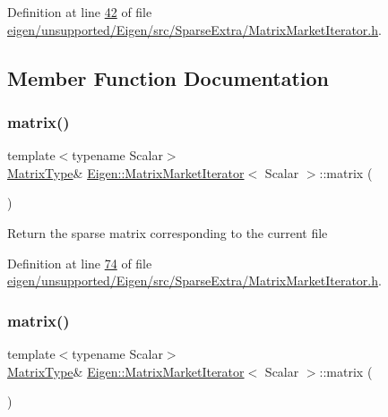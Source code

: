Definition at line \hyperlink{eigen_2unsupported_2_eigen_2src_2_sparse_extra_2_matrix_market_iterator_8h_source_l00042}{42} of file \hyperlink{eigen_2unsupported_2_eigen_2src_2_sparse_extra_2_matrix_market_iterator_8h_source}{eigen/unsupported/\+Eigen/src/\+Sparse\+Extra/\+Matrix\+Market\+Iterator.\+h}.



\subsection{Member Function Documentation}
\mbox{\label{class_eigen_1_1_matrix_market_iterator_ac938961d685306ef5b48d9943f7dcabd}} 
\subsubsection{\texorpdfstring{matrix()}{matrix()}\hspace{0.1cm}{\footnotesize\ttfamily [1/2]}}
{\footnotesize\ttfamily template$<$typename Scalar$>$ \\
\hyperlink{group___sparse_core___module}{Matrix\+Type}\& \hyperlink{class_eigen_1_1_matrix_market_iterator}{Eigen\+::\+Matrix\+Market\+Iterator}$<$ Scalar $>$\+::matrix (\begin{DoxyParamCaption}{ }\end{DoxyParamCaption})\hspace{0.3cm}{\ttfamily [inline]}}

Return the sparse matrix corresponding to the current file 

Definition at line \hyperlink{eigen_2unsupported_2_eigen_2src_2_sparse_extra_2_matrix_market_iterator_8h_source_l00074}{74} of file \hyperlink{eigen_2unsupported_2_eigen_2src_2_sparse_extra_2_matrix_market_iterator_8h_source}{eigen/unsupported/\+Eigen/src/\+Sparse\+Extra/\+Matrix\+Market\+Iterator.\+h}.

\mbox{\label{class_eigen_1_1_matrix_market_iterator_ac938961d685306ef5b48d9943f7dcabd}} 
\subsubsection{\texorpdfstring{matrix()}{matrix()}\hspace{0.1cm}{\footnotesize\ttfamily [2/2]}}
{\footnotesize\ttfamily template$<$typename Scalar$>$ \\
\hyperlink{group___sparse_core___module}{Matrix\+Type}\& \hyperlink{class_eigen_1_1_matrix_market_iterator}{Eigen\+::\+Matrix\+Market\+Iterator}$<$ Scalar $>$\+::matrix (\begin{DoxyParamCaption}{ }\end{DoxyParamCaption})\hspace{0.3cm}{\ttfamily [inline]}}

